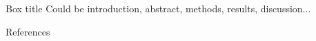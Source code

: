 \documentclass[
    a0paper, %
    portrait, %
    fontscale=0.4 %
    ]{baposter}
\begin{document}
\begin{poster}
\begin{posterbox}[
    name = box5,  %
    column = 1, %
    below = box2 %
    ]{Box title}
    Could be introduction, abstract, methods, results, discussion...
\end{posterbox}

\begin{posterbox}[
    name = references,  %
    column = 2, %
    below = box3 %
    ]{References}
\renewcommand{\section}[2]{} %
\nocite{*} %

\end{posterbox}

\end{poster}
\end{document}
